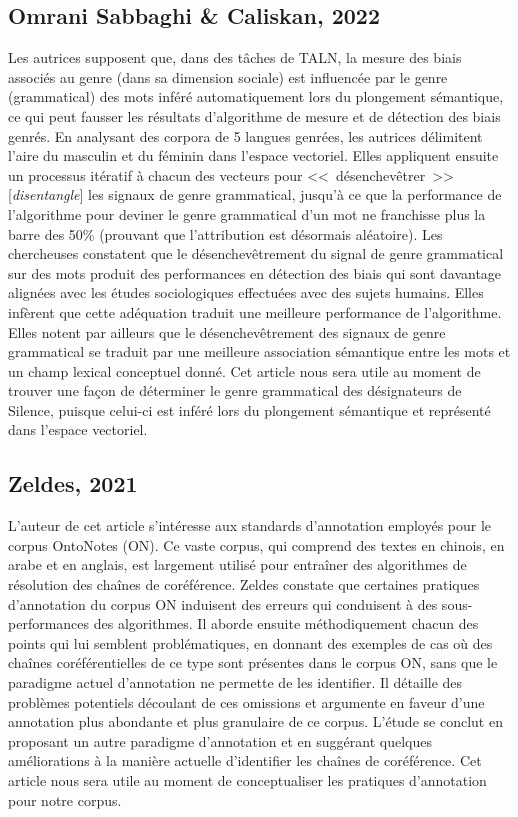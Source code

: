 \documentclass[hidelinks, 11pt, letterpaper]{article}
\newcommand{\guil}[1]{<<~{#1}~>>} %
\begin{document}
\subsection*{Omrani Sabbaghi \& Caliskan, 2022}
Les autrices supposent que, dans des tâches de TALN, la mesure des biais associés au genre (dans sa dimension sociale) est influencée par le genre (grammatical) des mots inféré automatiquement lors du plongement sémantique, ce qui peut fausser les résultats d'algorithme de mesure et de détection des biais genrés.
En analysant des corpora de 5 langues genrées, les autrices délimitent l'aire du masculin et du féminin dans l'espace vectoriel.
Elles appliquent ensuite un processus itératif à chacun des vecteurs pour \guil{désenchevêtrer} [\emph{disentangle}] les signaux de genre grammatical, jusqu'à ce que la performance de l'algorithme pour deviner le genre grammatical d'un mot ne franchisse plus la barre des 50\% (prouvant que l'attribution est désormais aléatoire).
Les chercheuses constatent que le désenchevêtrement du signal de genre grammatical sur des mots produit des performances en détection des biais qui sont davantage alignées avec les études sociologiques effectuées avec des sujets humains.
Elles infèrent que cette adéquation traduit une meilleure performance de l'algorithme.
Elles notent par ailleurs que le désenchevêtrement des signaux de genre grammatical se traduit par une meilleure association sémantique entre les mots et un champ lexical conceptuel donné.
Cet article nous sera utile au moment de trouver une façon de déterminer le genre grammatical des désignateurs de Silence, puisque celui-ci est inféré lors du plongement sémantique et représenté dans l'espace vectoriel.

\subsection*{Zeldes, 2021}
L'auteur de cet article s'intéresse aux standards d'annotation employés pour le corpus OntoNotes (ON).
Ce vaste corpus, qui comprend des textes en chinois, en arabe et en anglais, est largement utilisé pour entraîner des algorithmes de résolution des chaînes de coréférence.
Zeldes constate que certaines pratiques d'annotation du corpus ON induisent des erreurs qui conduisent à des sous-performances des algorithmes.
Il aborde ensuite méthodiquement chacun des points qui lui semblent problématiques, en donnant des exemples de cas où des chaînes coréférentielles de ce type sont présentes dans le corpus ON, sans que le paradigme actuel d'annotation ne permette de les identifier.
Il détaille des problèmes potentiels découlant de ces omissions et argumente en faveur d'une annotation plus abondante et plus granulaire de ce corpus.
L'étude se conclut en proposant un autre paradigme d'annotation et en suggérant quelques améliorations à la manière actuelle d'identifier les chaînes de coréférence.
Cet article nous sera utile au moment de conceptualiser les pratiques d'annotation pour notre corpus.
\end{document}
